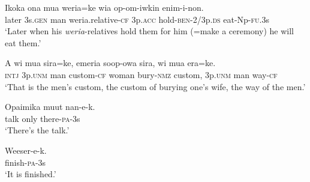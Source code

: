 \ea
\gll  Ikoka  ona  mua  weria=ke  wia  op-om-iwkin  enim-i-non. \\
later  3s.\textsc{gen}  man  weria.relative-\textsc{cf}  3p.\textsc{acc}  hold-\textsc{ben}-2/3p.\textsc{ds}  eat-Np-\textsc{fu}.3s \\
\glt ‘Later when his \textit{weria}{}-relatives hold them for him (=make a ceremony) he will eat them.’ \\
\z


\ea
\gll  A  wi  mua  sira=ke,  emeria  soop-owa  sira,  wi  mua        era=ke. \\
\textsc{intj}  3p.\textsc{unm}  man  custom-\textsc{cf}  woman  bury-\textsc{nmz}  custom,  3p.\textsc{unm}  man way-\textsc{cf} \\


\glt ‘That is the men’s custom, the custom of burying one’s wife, the way of the men.’ \\
\z


\ea
\gll  Opaimika  muut  nan-e-k. \\
talk  only  there-\textsc{pa}-3s \\
\glt ‘There’s the talk.’ \\
\z


\ea
\gll  Weeser-e-k. \\
finish-\textsc{pa}-3s \\
\glt ‘It is finished.’ \\
\z


